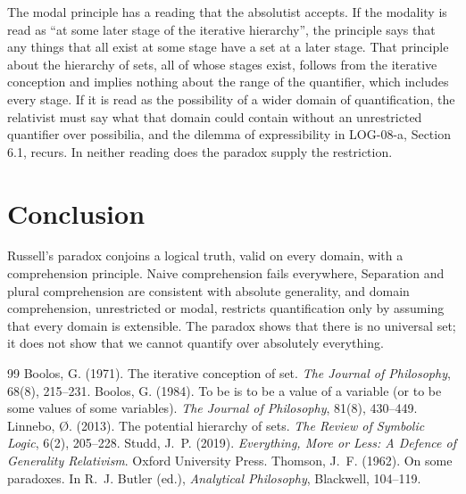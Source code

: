 \documentclass{situationist-preprint}
\begin{document}
\begin{reply}
The modal principle has a reading that the absolutist accepts. If the modality is read as \enquote{at some later stage of the iterative hierarchy}, the principle says that any things that all exist at some stage have a set at a later stage. That principle about the hierarchy of sets, all of whose stages exist, follows from the iterative conception \citep{Boolos1971} and implies nothing about the range of the quantifier, which includes every stage. If it is read as the possibility of a wider domain of quantification, the relativist must say what that domain could contain without an unrestricted quantifier over possibilia, and the dilemma of expressibility in LOG-08-a, Section 6.1, recurs. In neither reading does the paradox supply the restriction.
\end{reply}

\section{Conclusion}

Russell's paradox conjoins a logical truth, valid on every domain, with a comprehension principle. Naive comprehension fails everywhere, Separation and plural comprehension are consistent with absolute generality, and domain comprehension, unrestricted or modal, restricts quantification only by assuming that every domain is extensible. The paradox shows that there is no universal set; it does not show that we cannot quantify over absolutely everything.

\begin{thebibliography}{99}\small
{} Boolos, G. (1971). The iterative conception of set. \emph{The Journal of Philosophy}, 68(8), 215--231.
 Boolos, G. (1984). To be is to be a value of a variable (or to be some values of some variables). \emph{The Journal of Philosophy}, 81(8), 430--449.
 Linnebo, {\O}. (2013). The potential hierarchy of sets. \emph{The Review of Symbolic Logic}, 6(2), 205--228.
 Studd, J.~P. (2019). \emph{Everything, More or Less: A Defence of Generality Relativism}. Oxford University Press.
 Thomson, J.~F. (1962). On some paradoxes. In R.~J. Butler (ed.), \emph{Analytical Philosophy}, Blackwell, 104--119.
\end{thebibliography}
\end{document}
